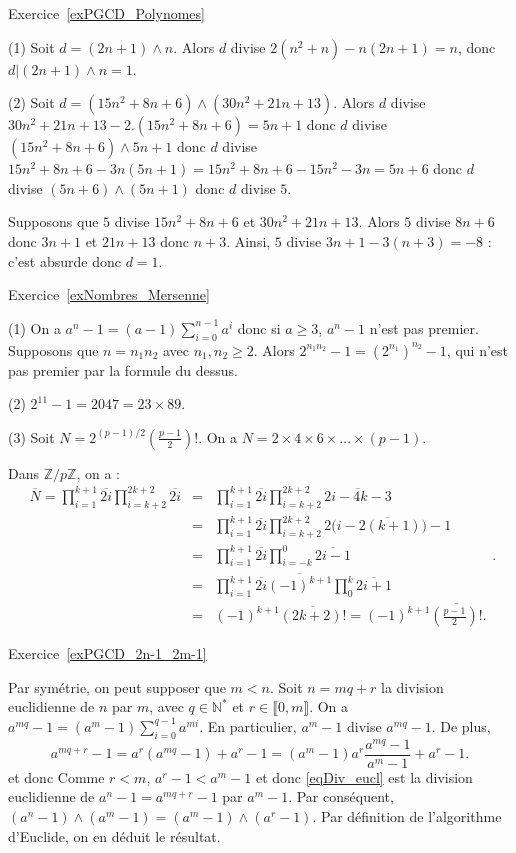 \documentclass[11pt,a4paper]{article}
\newcommand{\N}{\mathbb{N}}
\newcommand{\Z}{\mathbb{Z}}
\begin{document}
Exercice~\ref{exPGCD_Polynomes}

(1) Soit $d=(2n+1)\wedge n$. Alors $d$ divise $2(n^2+n)-n(2n+1)=n$, donc $d | (2n+1)\wedge n=1$.

(2) Soit $d=(15n^2+8n+6)\wedge (30 n^2+21n+13)$. Alors $d$ divise  $30 n^2+21n+13-2.(15 n^2+8n+6)=5n+1$ donc $d$ divise $(15 n^2+8n+6)\wedge 5n+1$ donc $d$ divise $15 n^2+8n+6-3n(5n+1)=15 n^2+8n+6-15n^2-3n=5n+6$ donc $d$ divise $(5n+6)\wedge(5n+1)$ donc $d$ divise $5$.

Supposons que $5$ divise $15n^2+8n+6$ et $30 n^2+21n+13$. Alors $5$ divise $8n+6$ donc $3n+1$ et $21n+13$ donc $n+3$. Ainsi, $5$ divise $3n+1-3(n+3)=-8$ : c'est absurde donc $d=1$. 

Exercice~\ref{exNombres_Mersenne}

(1) On a $a^n-1=(a-1)\sum_{i=0}^{n-1} a^i$ donc si $a\geq 3$, $a^n-1$ n'est pas premier. Supposons que $n=n_1n_2$ avec $n_1,n_2\geq 2$. Alors $2^{n_1n_2}-1=(2^{n_1})^{n_2}-1$, qui n'est pas premier par la formule du dessus.

(2) $2^{11}-1=2047=23\times 89$.

(3) Soit $N=2^{(p-1)/2} (\frac{p-1}{2})!$. On a $N=2\times 4\times 6\times \ldots \times (p-1)$. 

Dans $\Z/p\Z$, on a :\[\begin{aligned} \overline{N}=\prod_{i=1}^{k+1} \overline{2i}\prod_{i=k+2}^{2k+2} \overline{2i} &=&  \prod_{i=1}^{k+1} \overline{2i} \prod_{i=k+2}^{2k+2} \overline{2i-4k-3}\\
&=& \prod_{i=1}^{k+1} \overline{2i} \prod_{i=k+2}^{2k+2} \overline{2\big(i-2(k+1)\big)-1}\\
&=& \prod_{i=1}^{k+1} \overline{2i} \prod_{i=-k}^{0} \overline{2i-1}\\
&=& \prod_{i=1}^{k+1} \overline{2i}\overline{(-1)^{k+1}} \prod_{0}^{k} \overline{2i+1}\\
&=& (-1)^{k+1} \overline{(2k+2)!}=(-1)^{k+1}\overline{(\frac{p-1}{2})!}.\end{aligned}.\]

Exercice~\ref{exPGCD_2n-1_2m-1}


Par symétrie, on peut supposer que $m<n$. Soit $n=mq+r$ la division euclidienne de $n$ par $m$, avec $q\in \N^*$ et $r\in \llbracket 0,m\rrbracket$. On a $a^{mq}-1=(a^m-1)\sum_{i=0}^{q-1} a^{mi}$. En particulier, $a^m-1$ divise $a^{mq}-1$. De plus, \begin{equation}\label{eqDiv_eucl}
a^{mq+r}-1=a^r (a^{mq}-1)+a^{r}-1=(a^{m}-1)a^{r}\frac{a^{mq}-1}{a^m-1}+a^{r}-1.
\end{equation} et donc 
Comme $r<m$, $a^r-1<a^m-1$ et donc \eqref{eqDiv_eucl} est la division euclidienne de $a^n-1=a^{mq+r}-1$ par $a^m-1$. Par conséquent, $(a^{n}-1)\wedge (a^{m}-1)=(a^{m}-1)\wedge (a^r-1)$. Par définition de l'algorithme d'Euclide, on en déduit le résultat.
\end{document}

